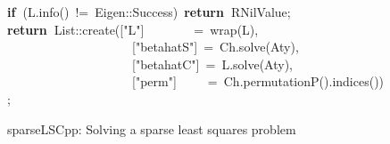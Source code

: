 \documentclass[shortnames,article]{jss}
\newcommand{\hlstd}[1]{\textcolor[rgb]{0,0,0}{#1}}
\newcommand{\hlopt}[1]{\textcolor[rgb]{0,0,0}{#1}}
\newcommand{\hlstr}[1]{\textcolor[rgb]{0.90,0.15,0.15}{#1}}
\newcommand{\hlkwa}[1]{\textcolor[rgb]{0.61,0.13,0.93}{\bf{#1}}}
\newcommand{\hlkwd}[1]{\textcolor[rgb]{0,0,0}{#1}}
\begin{document}
\begin{figure}[htb]
    \hlstd{}\hlkwa{if\ }\hlstd{}\hlopt{(}\hlstd{L}\hlopt{.}\hlstd{}\hlkwd{info}\hlstd{}\hlopt{()\ !=\ }\hlstd{Eigen}\hlopt{::}\hlstd{Success}\hlopt{)\ }\hlstd{}\hlkwa{return\ }\hlstd{R\textunderscore NilValue}\hlopt{;}\hspace*{\fill}\\
    \hlstd{}\hlkwa{return\ }\hlstd{List}\hlopt{::}\hlstd{}\hlkwd{create}\hlstd{}\hlopt{(}\hlstd{\textunderscore }\hlopt{{[}}\hlstd{}\hlstr{"L"}\hlstd{}\hlopt{{]}}\hlstd{\ \ \ \ \ \ \ \ }\hlopt{=\ }\hlstd{}\hlkwd{wrap}\hlstd{}\hlopt{(}\hlstd{L}\hlopt{),}\hspace*{\fill}\\
    \hlstd{}\hlstd{\ \ \ \ \ \ \ \ \ \ \ \ \ \ \ \ \ \ \ \ }\hlstd{\textunderscore }\hlopt{{[}}\hlstd{}\hlstr{"betahatS"}\hlstd{}\hlopt{{]}\ =\ }\hlstd{Ch}\hlopt{.}\hlstd{}\hlkwd{solve}\hlstd{}\hlopt{(}\hlstd{Aty}\hlopt{),}\hspace*{\fill}\\
    \hlstd{}\hlstd{\ \ \ \ \ \ \ \ \ \ \ \ \ \ \ \ \ \ \ \ }\hlstd{\textunderscore }\hlopt{{[}}\hlstd{}\hlstr{"betahatC"}\hlstd{}\hlopt{{]}\ =\ }\hlstd{L}\hlopt{.}\hlstd{}\hlkwd{solve}\hlstd{}\hlopt{(}\hlstd{Aty}\hlopt{),}\hspace*{\fill}\\
    \hlstd{}\hlstd{\ \ \ \ \ \ \ \ \ \ \ \ \ \ \ \ \ \ \ \ }\hlstd{\textunderscore }\hlopt{{[}}\hlstd{}\hlstr{"perm"}\hlstd{}\hlopt{{]}}\hlstd{\ \ \ \ \ }\hlopt{=\ }\hlstd{Ch}\hlopt{.}\hlstd{}\hlkwd{permutationP}\hlstd{}\hlopt{().}\hlstd{}\hlkwd{indices}\hlstd{}\hlopt{());}\hlstd{}\hspace*{\fill}\\
    \mbox{}
    \normalfont
    \normalsize
  \caption{sparseLSCpp: Solving a sparse least squares problem}
  \label{fig:spLS}
\end{figure}
\end{document}
